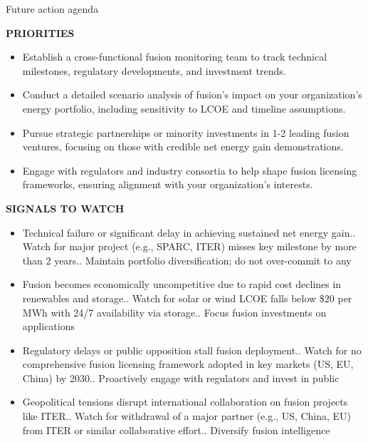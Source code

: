 \documentclass[10pt,a4paper]{article}
\begin{document}
\clearpage
{\sffamily\fontsize{21}{26}\selectfont\color{BONavy} Future action agenda}\par\vspace{7pt}
\begin{minipage}[t]{0.47\linewidth}
{\textcolor{BOGreen}{\scriptsize\bfseries PRIORITIES}}\par\vspace{3pt}
{\small\begin{itemize}
\item Establish a cross-functional fusion monitoring team to track technical milestones, regulatory developments, and investment trends.
\item Conduct a detailed scenario analysis of fusion's impact on your organization's energy portfolio, including sensitivity to LCOE and timeline assumptions.
\item Pursue strategic partnerships or minority investments in 1-2 leading fusion ventures, focusing on those with credible net energy gain demonstrations.
\item Engage with regulators and industry consortia to help shape fusion licensing frameworks, ensuring alignment with your organization's interests.
\end{itemize}}
\end{minipage}\hfill\begin{minipage}[t]{0.45\linewidth}
{\textcolor{BOGreen}{\scriptsize\bfseries SIGNALS TO WATCH}}\par\vspace{3pt}
{\small\begin{itemize}
\item Technical failure or significant delay in achieving sustained net energy gain.. Watch for major project (e.g., SPARC, ITER) misses key milestone by more than 2 years.. Maintain portfolio diversification; do not over-commit to any
\item Fusion becomes economically uncompetitive due to rapid cost declines in renewables and storage.. Watch for solar or wind LCOE falls below \$20 per MWh with 24/7 availability via storage.. Focus fusion investments on applications
\item Regulatory delays or public opposition stall fusion deployment.. Watch for no comprehensive fusion licensing framework adopted in key markets (US, EU, China) by 2030.. Proactively engage with regulators and invest in public
\item Geopolitical tensions disrupt international collaboration on fusion projects like ITER.. Watch for withdrawal of a major partner (e.g., US, China, EU) from ITER or similar collaborative effort.. Diversify fusion intelligence
\end{itemize}}
\end{minipage}
\end{document}
